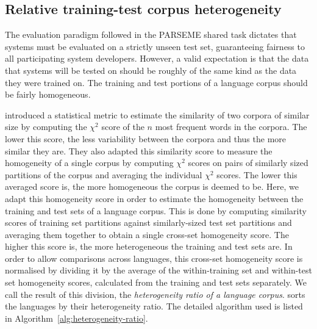 \documentclass[output=paper
,modfonts
,nonflat,draftmode]{langsci/langscibook}
\begin{document}
\subsection{Relative training-test corpus heterogeneity}

The evaluation paradigm followed in the PARSEME shared task dictates that systems must be evaluated on a strictly unseen test set, guaranteeing fairness to all participating system developers. However, a valid expectation is that the data that systems will be tested on should be roughly of the same kind as the data they were trained on. The training and test portions of a language corpus should be fairly homogeneous.

\citet{Kilgarriff1998} introduced a statistical metric to estimate the similarity of two corpora of similar size by computing the $\chi^{2}$ score of the $n$ most frequent words in the corpora. The lower this score, the less variability between the corpora and thus the more similar they are. They also adapted this similarity score to measure the homogeneity of a single corpus by computing $\chi^{2}$ scores on pairs of similarly sized partitions of the corpus and averaging the individual $\chi^{2}$ scores. The lower this averaged score is, the more homogeneous the corpus is deemed to be. Here, we adapt this homogeneity score in order to estimate the homogeneity between the training and test sets of a language corpus. This is done by computing similarity scores of training set partitions against similarly-sized test set partitions and averaging them together to obtain a single cross-set homogeneity score. The higher this score is, the more heterogeneous the training and test sets are. In order to allow comparisons across languages, this cross-set homogeneity score is normalised by dividing it by the average of the within-training set and within-test set homogeneity scores, calculated from the training and test sets separately. We call the result of this division, the \emph{heterogeneity ratio of a language corpus}.  sorts the languages by their heterogeneity ratio. The detailed algorithm used is listed in Algorithm~\ref{alg:heterogeneity-ratio}.
\end{document}
